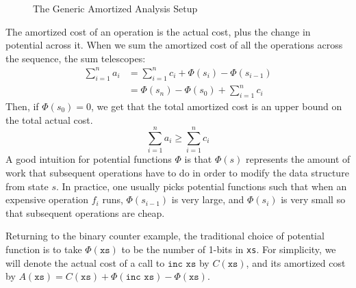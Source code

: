 \begin{figure}
  \caption{The Generic Amortized Analysis Setup}
  \label{fig:amortized-situation}
\end{figure}

The amortized cost of an operation is the actual cost, plus the change in potential across it. When we sum the amortized cost of all the operations across the sequence, the sum telescopes:
\begin{align*}
  \sum_{i=1}^n a_i &= \sum_{i=1}^n c_i + \Phi(s_i) - \Phi(s_{i-1})\\
                   &= \Phi(s_n) - \Phi(s_0) + \sum_{i=1}^n c_i
\end{align*}
Then, if $\Phi(s_0) = 0$, we get that the total amortized cost is an upper bound on the total actual cost.
$$
\sum_{i=1}^n a_i \geq \sum_{i=1}^n c_i
$$
A good intuition for potential functions $\Phi$ is that $\Phi(s)$ represents the amount of work that subsequent operations have to do in order to modify the data structure from state $s$.
In practice, one usually picks potential functions such that when an expensive operation $f_i$ runs, $\Phi(s_{i-1})$ is very large, and $\Phi(s_i)$ is very small so that subsequent operations are cheap.

Returning to the binary counter example, the traditional choice of potential function is to take $\Phi(\texttt{xs})$ to be the number of 1-bits in \texttt{xs}.
For simplicity, we will denote the actual cost of a call to $\texttt{inc xs}$ by $C(\texttt{xs})$, and its amortized cost by $A(\texttt{xs}) = C(\texttt{xs}) + \Phi(\texttt{inc xs}) - \Phi(\texttt{xs})$.


